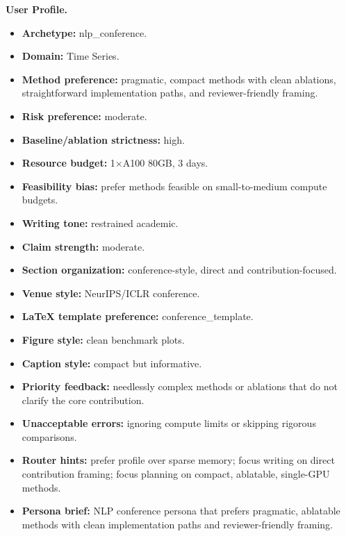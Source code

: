 \documentclass{opendatalab}
\begin{document}
\begin{tcolorbox}[
  breakable,
  colback=orange!3,
  colframe=orange!60!black,
  boxrule=0.5pt,
  arc=2pt,
  left=6pt, right=6pt, top=6pt, bottom=6pt,
  title=\textbf{Profile B: Ablation-Focused Conference Researcher},
  fonttitle=\small\bfseries
]
\small
\textbf{User Profile.}
\begin{itemize}\setlength\itemsep{1pt}
  \item \textbf{Archetype:} nlp\_conference.
  \item \textbf{Domain:} Time Series.
  \item \textbf{Method preference:} pragmatic, compact methods with clean ablations, straightforward implementation paths, and reviewer-friendly framing.
  \item \textbf{Risk preference:} moderate.
  \item \textbf{Baseline/ablation strictness:} high.
  \item \textbf{Resource budget:} 1$\times$A100 80GB, 3 days.
  \item \textbf{Feasibility bias:} prefer methods feasible on small-to-medium compute budgets.
  \item \textbf{Writing tone:} restrained academic.
  \item \textbf{Claim strength:} moderate.
  \item \textbf{Section organization:} conference-style, direct and contribution-focused.
  \item \textbf{Venue style:} NeurIPS/ICLR conference.
  \item \textbf{LaTeX template preference:} conference\_template.
  \item \textbf{Figure style:} clean benchmark plots.
  \item \textbf{Caption style:} compact but informative.
  \item \textbf{Priority feedback:} needlessly complex methods or ablations that do not clarify the core contribution.
  \item \textbf{Unacceptable errors:} ignoring compute limits or skipping rigorous comparisons.
  \item \textbf{Router hints:} prefer profile over sparse memory; focus writing on direct contribution framing; focus planning on compact, ablatable, single-GPU methods.
  \item \textbf{Persona brief:} NLP conference persona that prefers pragmatic, ablatable methods with clean implementation paths and reviewer-friendly framing.
\end{itemize}


\end{tcolorbox}
\end{document}
